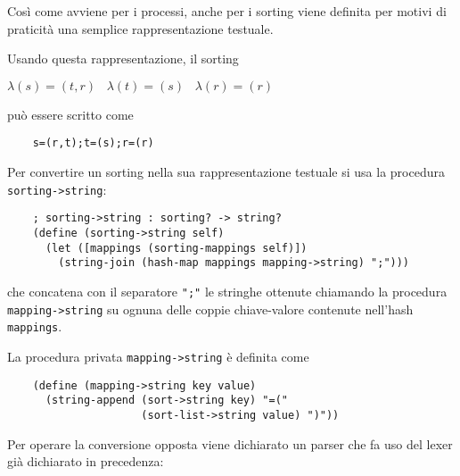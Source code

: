 Cos\`i come avviene per i processi, anche per i sorting viene definita
per motivi di praticit\`a una semplice rappresentazione testuale.

Usando questa rappresentazione, il sorting

\begin{pilisting}
$
    \lambda(s) = (t,r) \;\;\;
    \lambda(t) = (s)   \;\;\;
    \lambda(r) = (r)
$
\end{pilisting}

pu\`o essere scritto come

\begin{termlisting}
\begin{lstlisting}
    s=(r,t);t=(s);r=(r)
\end{lstlisting}
\end{termlisting}

Per convertire un sorting nella sua rappresentazione testuale si usa
la procedura \lstinline{sorting->string}:

\begin{lstlisting}
    ; sorting->string : sorting? -> string?
    (define (sorting->string self)
      (let ([mappings (sorting-mappings self)])
        (string-join (hash-map mappings mapping->string) ";")))
\end{lstlisting}

che concatena con il separatore \lstinline{";"} le stringhe ottenute
chiamando la procedura \lstinline{mapping->string} su ognuna delle
coppie chiave-valore contenute nell'hash \lstinline{mappings}.

La procedura privata \lstinline{mapping->string} \`e definita come

\begin{lstlisting}
    (define (mapping->string key value)
      (string-append (sort->string key) "=("
                     (sort-list->string value) ")"))
\end{lstlisting}

Per operare la conversione opposta viene dichiarato un parser che fa
uso del lexer gi\`a dichiarato in precedenza:

